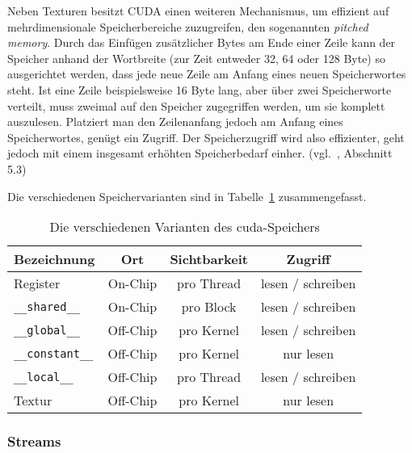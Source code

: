 Neben Texturen besitzt CUDA einen weiteren Mechanismus, um effizient auf mehrdimensionale Speicherbereiche zuzugreifen,
den sogenannten \textit{pitched memory}. Durch das Einfügen zusätzlicher Bytes am Ende einer Zeile kann der Speicher
anhand der Wortbreite (zur Zeit entweder 32, 64 oder 128 Byte) so ausgerichtet werden, dass jede neue Zeile am Anfang
eines neuen Speicherwortes steht. Ist eine Zeile beispielsweise 16 Byte lang, aber über zwei Speicherworte verteilt,
muss zweimal auf den Speicher zugegriffen werden, um sie komplett auszulesen. Platziert man den Zeilenanfang jedoch am
Anfang eines Speicherwortes, genügt ein Zugriff. Der Speicherzugriff wird also effizienter, geht jedoch mit einem
insgesamt erhöhten Speicherbedarf einher. (vgl.~\cite{cudaprog}, Abschnitt 5.3)

Die verschiedenen Speichervarianten sind in Tabelle~\ref{table:cu_mem_hierarchie} zusammengefasst.

\begin{table}
    \centering
    \begin{tabular}{| l | c | c | c |}
        \hline
        Bezeichnung & Ort & Sichtbarkeit & Zugriff\\
        \hline
        \hline
        Register & On-Chip & pro Thread & lesen / schreiben \\
        \hline
        \texttt{\_\_shared\_\_} & On-Chip & pro Block & lesen / schreiben \\
        \hline
        \texttt{\_\_global\_\_} & Off-Chip & pro Kernel & lesen / schreiben \\
        \hline
        \texttt{\_\_constant\_\_} & Off-Chip & pro Kernel & nur lesen \\
        \hline
        \texttt{\_\_local\_\_} & Off-Chip & pro Thread & lesen / schreiben\\
        \hline
        Textur & Off-Chip & pro Kernel & nur lesen\\
        \hline
    \end{tabular}
    \caption{Die verschiedenen Varianten des \gls{cuda}-Speichers}
    \label{table:cu_mem_hierarchie}
\end{table}

\subsubsection*{Streams}


